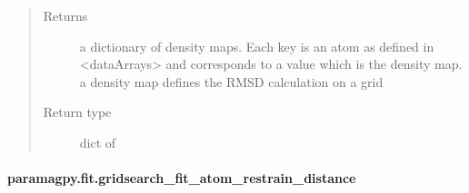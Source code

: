\documentclass[a4paper,10pt,english,openany,oneside]{sphinxmanual}
\begin{document}
\begin{fulllineitems}
\begin{quote}
\begin{description}
\begin{itemize}
\end{itemize}

\item[{Returns}] \leavevmode
{} \textendash{} a dictionary of density maps. Each key is an atom
as defined in \textless{}dataArrays\textgreater{} and corresponds to a value
which is the density map.
a density map defines the RMSD calculation on a grid

\item[{Return type}] \leavevmode
dict of 

\end{description}\end{quote}

\end{fulllineitems}



\paragraph{paramagpy.fit.gridsearch\_fit\_atom\_restrain\_distance}
\label{\detokenize{reference/generated/paramagpy.fit.gridsearch_fit_atom_restrain_distance:paramagpy-fit-gridsearch-fit-atom-restrain-distance}}\label{\detokenize{reference/generated/paramagpy.fit.gridsearch_fit_atom_restrain_distance::doc}}
\end{document}
